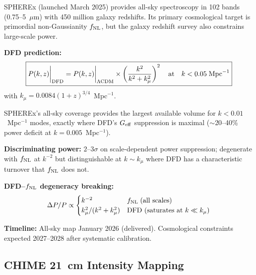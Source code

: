 \documentclass[11pt,a4paper]{article}
\begin{document}
\begin{newbox}

SPHEREx (launched March 2025) provides all-sky spectroscopy in
102 bands (0.75--5~$\mu$m) with 450 million galaxy redshifts.
Its primary cosmological target is primordial non-Gaussianity $f_{\rm NL}$,
but the galaxy redshift survey also constrains large-scale power.

\textbf{DFD prediction:}
\begin{equation}
\boxed{
P(k,z)\bigg|_{\rm DFD} = P(k,z)\bigg|_{\Lambda\rm CDM} \times
\left(\frac{k^2}{k^2 + k_\mu^2}\right)^2
\quad\text{at}\quad k < 0.05\;\text{Mpc}^{-1}
}
\end{equation}
with $k_\mu = 0.0084(1+z)^{3/4}$~Mpc$^{-1}$.

SPHEREx's all-sky coverage provides the largest available volume for
$k < 0.01$~Mpc$^{-1}$ modes, exactly where DFD's $G_{\rm eff}$
suppression is maximal ($\sim$20--40\% power deficit at $k = 0.005$~Mpc$^{-1}$).

\textbf{Discriminating power:} $2$--$3\sigma$ on scale-dependent power
suppression; degenerate with $f_{\rm NL}$ at $k^{-2}$ but
distinguishable at $k \sim k_\mu$ where DFD has a characteristic
turnover that $f_{\rm NL}$ does not.

\textbf{DFD--$f_{\rm NL}$ degeneracy breaking:}
\begin{equation}
\Delta P/P \propto \begin{cases}
k^{-2} & f_{\rm NL}\;\text{(all scales)} \\
k_\mu^2/(k^2 + k_\mu^2) & \text{DFD (saturates at }k \ll k_\mu\text{)}
\end{cases}
\end{equation}

\textbf{Timeline:} All-sky map January 2026 (delivered). Cosmological
constraints expected 2027--2028 after systematic calibration.
\end{newbox}

\subsection{CHIME 21~cm Intensity Mapping}
\end{document}
